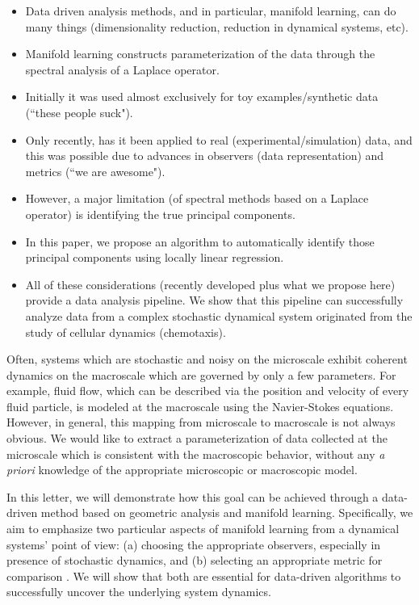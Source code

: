 \documentclass[preprint]{elsarticle}
\begin{document}
\begin{itemize}

\item
Data driven analysis methods, and in particular, manifold learning, can do many things (dimensionality reduction, reduction in dynamical systems, etc). 

\item
Manifold learning constructs parameterization of the data through the spectral analysis of a Laplace operator.

\item
Initially it was used almost exclusively for toy examples/synthetic data (``these people suck").

\item
Only recently, has it been applied to real (experimental/simulation) data, and this was possible due to advances in observers (data representation) and metrics (``we are awesome"). 

\item
However, a major limitation (of spectral methods based on a Laplace operator) is identifying the true principal components.

\item
In this paper, we propose an algorithm to automatically identify those principal components using locally linear regression.

\item
All of these considerations (recently developed plus what we propose here) provide a data analysis pipeline. We show that this pipeline can successfully analyze data from a complex stochastic dynamical system originated from the study of cellular dynamics (chemotaxis).

\end{itemize}

Often, systems which are stochastic and noisy on the microscale exhibit coherent dynamics on the macroscale which are governed by only a few parameters.
%
For example, fluid flow, which can be described via the position and velocity of every fluid particle, is modeled at the macroscale using the Navier-Stokes equations.
%
However, in general, this mapping from microscale to macroscale is not always obvious.
%
We would like to extract a parameterization of data collected at the microscale which is consistent with the macroscopic behavior, without any {\em a priori} knowledge of the appropriate microscopic or macroscopic model.

In this letter, we will demonstrate how this goal can be achieved through a data-driven method based on geometric analysis and manifold learning. 
%
Specifically, we aim to emphasize two particular aspects of manifold learning from a dynamical systems' point of view: (a) choosing the appropriate observers, especially in presence of stochastic dynamics, and (b) selecting an appropriate metric for comparison \cite{mallat2012group}. 
%
We will show that both are essential for data-driven algorithms to successfully uncover the underlying system dynamics. 
\end{document}
